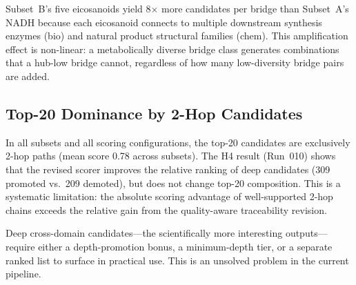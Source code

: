 Subset~B's five eicosanoids yield 8$\times$ more candidates per bridge than
Subset~A's NADH because each eicosanoid connects to multiple downstream synthesis
enzymes (bio) and natural product structural families (chem).
This amplification effect is non-linear: a metabolically diverse bridge class
generates combinations that a hub-low bridge cannot, regardless of how many
low-diversity bridge pairs are added.

\subsection{Top-20 Dominance by 2-Hop Candidates}

In all subsets and all scoring configurations, the top-20 candidates are exclusively
2-hop paths (mean score 0.78 across subsets).
The H4 result (Run~010) shows that the revised scorer improves the relative ranking
of deep candidates (309 promoted vs.\ 209 demoted), but does not change top-20
composition.
This is a systematic limitation: the absolute scoring advantage of well-supported
2-hop chains exceeds the relative gain from the quality-aware traceability revision.

Deep cross-domain candidates---the scientifically more interesting outputs---require
either a depth-promotion bonus, a minimum-depth tier, or a separate ranked list to
surface in practical use.
This is an unsolved problem in the current pipeline.
